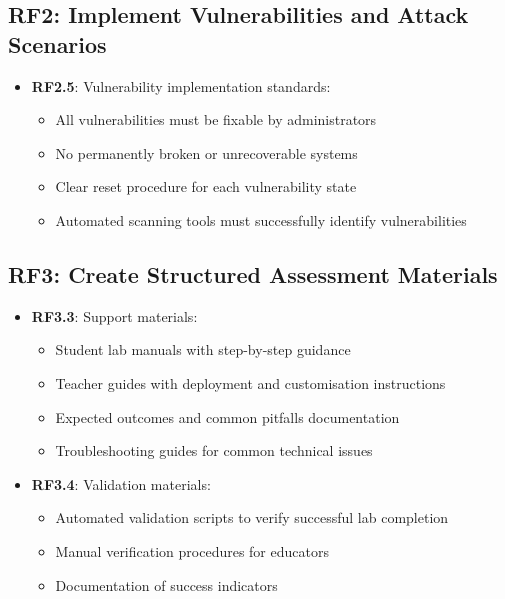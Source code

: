 \subsection{RF2: Implement Vulnerabilities and Attack Scenarios}

\begin{itemize}

\item \textbf{RF2.5}: Vulnerability implementation standards:
\begin{itemize}
\item All vulnerabilities must be fixable by administrators
\item No permanently broken or unrecoverable systems
\item Clear reset procedure for each vulnerability state
\item Automated scanning tools must successfully identify vulnerabilities
\end{itemize}

\end{itemize}

\subsection{RF3: Create Structured Assessment Materials}

\begin{itemize}

\item \textbf{RF3.3}: Support materials:
\begin{itemize}
\item Student lab manuals with step-by-step guidance
\item Teacher guides with deployment and customisation instructions
\item Expected outcomes and common pitfalls documentation
\item Troubleshooting guides for common technical issues
\end{itemize}

\item \textbf{RF3.4}: Validation materials:
\begin{itemize}
\item Automated validation scripts to verify successful lab completion
\item Manual verification procedures for educators
\item Documentation of success indicators
\end{itemize}

\end{itemize}

